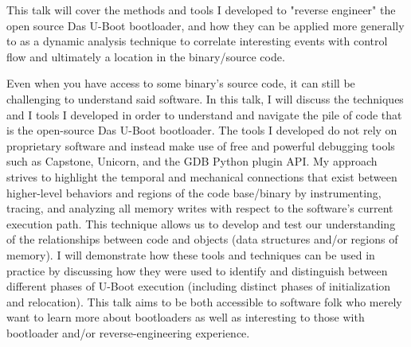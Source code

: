 \def\abstracttitle{Bushwhacking Your Way Around a Bootloader}
\def\abstractcomment{Regular Talk}
\def\abstractowner{.bx}

\thispagestyle{abstract}

This talk will cover the methods and tools I developed to "reverse engineer" the open source Das U-Boot bootloader, and how they can be applied more generally to as a dynamic analysis technique to correlate interesting events with control flow and ultimately a location in the binary/source code.

Even when you have access to some binary's source code, it can still be challenging to understand said software. In this talk, I will discuss the techniques and I tools I developed in order to understand and navigate the pile of code that is the open-source Das U-Boot bootloader. The tools I developed do not rely on proprietary software and instead make use of free and powerful debugging tools such as Capstone, Unicorn, and the GDB Python plugin API. My approach strives to highlight the temporal and mechanical connections that exist between higher-level behaviors and regions of the code base/binary by instrumenting, tracing, and analyzing all memory writes with respect to the software's current execution path. This technique allows us to develop and test our understanding of the relationships between code and objects (data structures and/or regions of memory). I will demonstrate how these tools and techniques can be used in practice by discussing how they were used to identify and distinguish between different phases of U-Boot execution (including distinct phases of initialization and relocation). This talk aims to be both accessible to software folk who merely want to learn more about bootloaders as well as interesting to those with bootloader and/or reverse-engineering experience.
